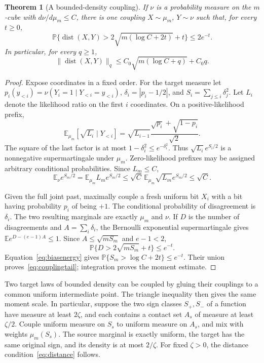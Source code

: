 \documentclass[11pt]{article}
\newtheorem{theorem}{Theorem}[section]
\theoremstyle{remark}\newtheorem{remark}[theorem]{Remark}
\newcommand{\E}{\mathbb E}\newcommand{\Prb}{\mathbb P}
\newcommand{\1}{\mathbf 1}\newcommand{\norm}[2]{\lVert #1\rVert_{#2}}
\newcommand{\dist}{\operatorname{dist}}\newcommand{\sgn}{\operatorname{sign}}
\begin{document}
\begin{theorem}[A bounded-density coupling]\label{thm:coupling}
If $\nu$ is a probability measure on the $m$-cube with $d\nu/d\mu_m\le C$, there is one coupling $X\sim\mu_m$, $Y\sim\nu$ such that, for every $t\ge0$,
\begin{equation}\label{eq:couplingtail}
 \Prb\{\dist(X,Y)>2\sqrt{m(\log C+2t)}+t\}\le2e^{-t}.
\end{equation}
In particular, for every $q\ge1$,
\[
 \norm{\dist(X,Y)}q\le C_0\sqrt{m(\log C+q)}+C_0q.
\]
\end{theorem}
\begin{proof}
Expose coordinates in a fixed order. For the target measure let
$p_i(y_{<i})=\nu(Y_i=1\mid Y_{<i}=y_{<i})$, $\delta_i=|p_i-1/2|$, and
$S_i=\sum_{j\le i}\delta_j^2$. Let $L_i$ denote the likelihood ratio on the first $i$ coordinates. On a positive-likelihood prefix,
\[
 \E_{\mu_m}[\sqrt{L_i}\mid Y_{<i}]
 =\sqrt{L_{i-1}}\frac{\sqrt{p_i}+\sqrt{1-p_i}}{\sqrt2}.
\]
The square of the last factor is at most $1-\delta_i^2\le e^{-\delta_i^2}$. Thus $\sqrt{L_i}e^{S_i/2}$ is a nonnegative supermartingale under $\mu_m$. Zero-likelihood prefixes may be assigned arbitrary conditional probabilities. Since $L_m\le C$,
\begin{equation}\label{eq:biasenergy}
 \E_\nu e^{S_m/2}
 =\E_{\mu_m}L_m e^{S_m/2}
 \le\sqrt C\,\E_{\mu_m}\sqrt{L_m}e^{S_m/2}\le\sqrt C.
\end{equation}

Given the full joint past, maximally couple a fresh uniform bit $X_i$ with a bit having probability $p_i$ of being $+1$. The conditional probability of disagreement is $\delta_i$. The two resulting marginals are exactly $\mu_m$ and $\nu$. If $D$ is the number of disagreements and $A=\sum_i\delta_i$, the Bernoulli exponential supermartingale gives
$\E e^{D-(e-1)A}\le1$. Since $A\le\sqrt{mS_m}$ and $e-1<2$,
\[
 \Prb\{D>2\sqrt{mS_m}+t\}\le e^{-t}.
\]
Equation~\eqref{eq:biasenergy} gives
$\Prb\{S_m>\log C+2t\}\le e^{-t}$. Their union proves~\eqref{eq:couplingtail}; integration proves the moment estimate.
\end{proof}

Two target laws of bounded density can be coupled by gluing their couplings to a common uniform intermediate point. The triangle inequality then gives the same moment scale. In particular, suppose the two sign classes $S_+,S_-$ of a function have measure at least $2\zeta$, and each contains a contact set $A_s$ of measure at least $\zeta/2$. Couple uniform measure on $S_s$ to uniform measure on $A_s$, and mix with weights $\mu_m(S_s)$. The source marginal is exactly uniform, the target has the same original sign, and its density is at most $2/\zeta$. For fixed $\zeta>0$, the distance condition~\eqref{eq:distance} follows.
\end{document}
